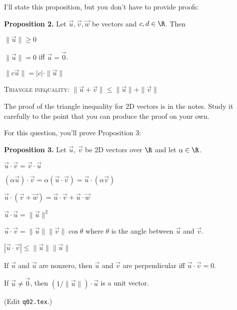 
I'll state this proposition, but you don't have to provide proofs:

\textbf{Proposition 2.}
Let $\vec{u}, \vec{v}, \vec{w}$ be vectors and $c, d \in \R$.
Then
\begin{myenumt}
\item $\| \vec{u} \| \geq 0$
\item $\| \vec{u} \| = 0$ iff $\vec{u} = \vec{0}$.
\item $\| c \vec{u} \| = |c| \cdot \| \vec{u} \|$
\item \textsc{Triangle inequality}: $\| \vec{u} + \vec{v} \| \leq \| \vec{u} \| + \| \vec{v} \|$
\end{myenumt}

The proof of the triangle inequality for 2D vectors is in the notes.
Study it carefully to the point that you can produce the proof on your own.

For this question, you'll prove Proposition 3:

\textbf{Proposition 3.}
Let $\vec{u}$, $\vec{v}$ be 2D vectors over $\R$
and let $\alpha \in \R$.
\begin{myenumt}
\item
  $\vec{u} \cdot \vec{v} = \vec{v} \cdot \vec{u}$
\item
  $(\alpha \vec{u}) \cdot \vec{v}
  =
  \alpha (\vec{u} \cdot \vec{v})
  =
  \vec{u} \cdot (\alpha \vec{v})$
\item
  $\vec{u} \cdot ( \vec{v} + \vec{w} )
  =
  \vec{u} \cdot \vec{v} + \vec{u} \cdot \vec{w}$
\item 
  $\vec{u} \cdot \vec{u} 
  =
  \| \vec{u} \|^2$
\item
  $\vec{u} \cdot \vec{v} =  \| \vec{u} \| \| \vec{v} \| \cos \theta$
  where
  $\theta$ is the angle between $\vec{u}$ and $\vec{v}$.
\item
  $| \vec{u} \cdot \vec{v} | \leq \| \vec{u} \| \| \vec{u} \|$
\item
  If $\vec{u}$ and $\vec{u}$ are nonzero, then
  $\vec{u}$ and $\vec{v}$ are perpendicular iff $\vec{u} \cdot \vec{v} = 0$.
\item
  If $\vec{u} \neq \vec{0}$, then
  $(1/\|\vec{u}\|) \cdot \vec{u}$ is a unit vector.
\end{myenumt}
(Edit \verb!q02.tex!.)
